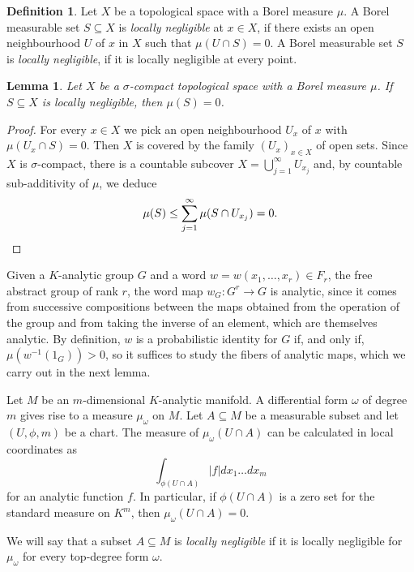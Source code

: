 \documentclass[a4paper,10pt]{amsart}
\theoremstyle{plain}
\newtheorem{lemma}[thm]{Lemma}
\theoremstyle{definition}
\newtheorem{definition}[thm]{Definition}
\numberwithin{equation}{section}
\begin{document}
\begin{definition}
Let $X$ be a topological space with a Borel measure $\mu$. A Borel measurable set $S \subseteq X$ is \emph{locally negligible} at $x \in X$, if there exists an open neighbourhood $U$ of $x$ in $X$ such that $\mu(U \cap S) = 0$. A Borel measurable set $S$ is \emph{locally negligible}, if it is locally negligible at every point.
\end{definition}
\begin{lemma}\label{lem:locallyneg}
Let $X$ be a $\sigma$-compact topological space with a Borel measure $\mu$. 
If $S \subseteq X$ is locally negligible, then $\mu(S) = 0$.
\end{lemma}
\begin{proof}
For every $x \in X$ we pick an open neighbourhood $U_x$ of $x$ with $\mu(U_x \cap S)=0$. Then $X$ is covered by the family $(U_x)_{x \in X}$ of open sets. Since $X$ is $\sigma$-compact, there is a countable subcover $X = \bigcup_{j=1}^\infty U_{x_j}$ and, by countable sub-additivity of $\mu$, we deduce
\[
 \mu(S) \leq \sum_{j=1}^\infty \mu(S \cap U_{x_j} ) = 0. \qedhere
\]
\end{proof}

Given a $K$-analytic group $G$ and a word $w = w(x_1,\ldots,x_r) \in F_r$, the free abstract group of rank $r$, the word map $w_G \colon G^r  \to G$ is analytic, since it comes from successive compositions between the maps obtained from the operation of the group and from taking the inverse of an element, which are themselves analytic. By definition, $w$ is a probabilistic identity for $G$ if, and only if, $\mu(w^{-1}(1_G)) > 0$, so it suffices to study the fibers of analytic maps, which we carry out in the next lemma.

Let $M$ be an $m$-dimensional $K$-analytic manifold. A differential form $\omega$ of degree $m$ gives rise to a measure $\mu_\omega$ on $M$. Let $A \subseteq M$ be a measurable subset and let $(U,\phi,m)$ be a chart. The measure of $\mu_\omega(U\cap A)$ can be calculated in local coordinates as
\[
    \int_{\phi(U\cap A)} |f| dx_1\dots dx_m
\] for an analytic function $f$.
In particular, if $\phi(U\cap A)$ is a zero set for the standard measure on $K^m$, then $\mu_\omega(U\cap A) = 0$. 

We will say that a subset $A \subseteq M$ is
\emph{locally negligible} if it is locally negligible for $\mu_\omega$ for every top-degree form $\omega$.
\end{document}
